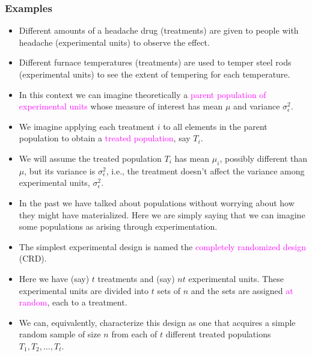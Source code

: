 \documentclass[xcolor=dvipsnames,12pt]{beamer}
\begin{document}
\begin{frame}
\frametitle{Examples}
\begin{itemize}
\item Different amounts of a headache drug (treatments) are
      given to people with headache (experimental units) to
      observe the effect.
\item Different furnace temperatures (treatments) are used
      to temper steel rods (experimental units) to see the
      extent of tempering for each temperature.
\end{itemize}
\end{frame}



\begin{frame}
\begin{itemize}
\item In this context we can imagine theoretically a \textcolor{magenta}{parent}
\textcolor{magenta}{population of} \textcolor{magenta}{ experimental units} whose measure of
interest has mean $\mu$ and variance $\sigma_{\epsilon}^2$.
\item We imagine applying each treatment $i$  to all elements in
the parent population to obtain a \textcolor{magenta}{ treated population},
say $T_i$. 
\item We will assume the treated population $T_i$ has mean
$\mu_i$, possibly different than $\mu$, but its variance is
$\sigma_\epsilon^2$, i.e., the treatment doesn't affect
the variance among experimental units, $\sigma_\epsilon^2$.
\end{itemize}
\end{frame}


\begin{frame}
\begin{itemize}
\item In the past we have talked about populations without worrying
about how they might have materialized.  Here we are simply
saying that we can imagine some populations as arising 
through experimentation.
\item The simplest experimental design is named the \textcolor{magenta}{ completely}
\textcolor{magenta}{ randomized} \textcolor{magenta}{ design} (CRD). 
\item  Here we have (say) $t$ treatments
and (say) $nt$ experimental units.  These experimental units
are divided into $t$ sets of $n$ and the sets are assigned
\textcolor{magenta}{ at random}, each to a treatment.
\item We can, equivalently, characterize this design as one that
acquires a simple random sample of size $n$ from each of $t$
different treated populations $T_1, T_2, \ldots, T_t$. 
\end{itemize}
\end{frame}
\end{document}
